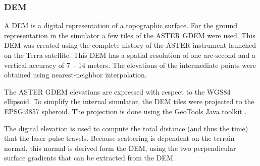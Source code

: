 \subsubsection{\acl{DEM}}
\label{DEM}

A \acl{DEM} is a digital representation of a topographic surface. For the ground representation
in the simulator a few tiles of the \ac{ASTER} \ac{GDEM} were used. This \ac{DEM} was created using the
complete history of the \ac{ASTER} instrument launched on the Terra satellite. This \ac{DEM} has a
spatial resolution of one arc-second and a vertical accuracy of 7 -- 14 meters. The elevations of the
intermediate points were obtained using nearest-neighbor interpolation.

The \ac{ASTER} \ac{GDEM} elevations are expressed with respect to the \ac{WGS84} ellipsoid. To simplify the
internal simulator, the \ac{DEM} tiles were projected to the EPSG:3857 spheroid. The projection
is done using the GeoTools Java toolkit \cite{geotools}.

The digital elevation is used to compute the total distance (and thus the time) that the laser pulse
travels. Because scattering is dependent on the terrain normal, this normal is
derived form the \ac{DEM}, using the two perpendicular surface gradients that
can be extracted from the \ac{DEM}.
